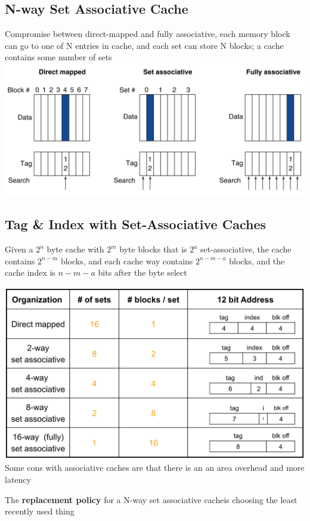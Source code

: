 
\subsection*{N-way Set Associative Cache}
Compromise between direct-mapped and fully associative, each memory block can go
 to one of N entries in cache, and each set can store N blocks; a cache contains
 some number of sets
\includegraphics[width=\linewidth]{png/nway.png}

\subsection*{Tag \& Index with Set-Associative Caches}
Given a $2^n$ byte cache with $2^m$ byte blocks that is $2^a$ set-associative,
the cache contains $2^{n-m}$ blocks, and each cache way contains $2^{n-m-a}$ blocks,
and the cache index is $n-m-a$ bits after the byte select

\includegraphics[width=\linewidth]{png/ex.png}
Some cons with associative caches are that there is an an area overhead and more latency

The \textbf{replacement policy} for a N-way set associative cacheis choosing the
least recently used thing

